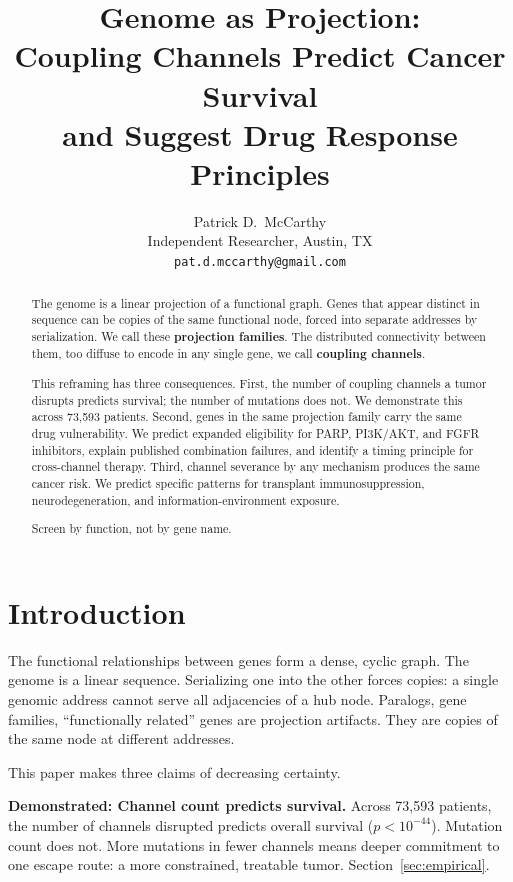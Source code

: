 \documentclass[11pt]{article}
\title{Genome as Projection:\\Coupling Channels Predict Cancer Survival\\and Suggest Drug Response Principles}
\author{Patrick D.\ McCarthy\\
\small Independent Researcher, Austin, TX\\
\small \texttt{pat.d.mccarthy@gmail.com}}
\date{}
\begin{document}
\maketitle

\begin{abstract}
The genome is a linear projection of a functional graph. Genes that
appear distinct in sequence can be copies of the same functional
node, forced into separate addresses by serialization. We call these
\textbf{projection families}. The distributed connectivity between
them, too diffuse to encode in any single gene, we call
\textbf{coupling channels}.

This reframing has three consequences. First, the number of coupling
channels a tumor disrupts predicts survival; the number of mutations
does not. We demonstrate this across 73{,}593 patients. Second,
genes in the same projection family carry the same drug
vulnerability. We predict expanded eligibility for PARP, PI3K/AKT,
and FGFR inhibitors, explain published combination failures, and
identify a timing principle for cross-channel therapy. Third,
channel severance by any mechanism produces the same cancer risk.
We predict specific patterns for transplant immunosuppression,
neurodegeneration, and information-environment exposure.

Screen by function, not by gene name.
\end{abstract}

\section{Introduction}
\label{sec:intro}

The functional relationships between genes form a dense, cyclic
graph. The genome is a linear sequence. Serializing one into the
other forces copies: a single genomic address cannot serve all
adjacencies of a hub node. Paralogs, gene families, ``functionally
related'' genes are projection artifacts. They are copies of the
same node at different addresses.

This paper makes three claims of decreasing certainty.

\textbf{Demonstrated: Channel count predicts survival.} Across
73{,}593 patients, the number of channels disrupted predicts overall
survival ($p < 10^{-44}$). Mutation count does not. More mutations
in fewer channels means deeper commitment to one escape route: a
more constrained, treatable tumor. Section~\ref{sec:empirical}.
\end{document}

